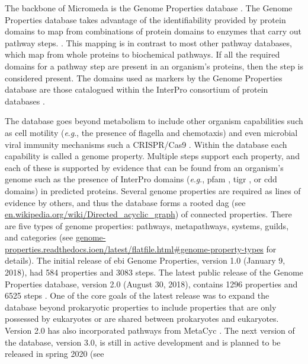 The backbone of Micromeda is the Genome Properties database \cite{Haft2013}. 
The Genome Properties database takes advantage of the identifiability provided 
by protein domains to map from combinations of protein domains to enzymes that 
carry out pathway steps. \cite{richardson2018genome}. This mapping is in 
contrast to most other pathway databases, which map from whole proteins to 
biochemical pathways. If all the required domains for a pathway step are present 
in an organism's proteins, then the step is considered present. The domains used 
as markers by the Genome Properties database are those catalogued within the 
InterPro consortium of protein databases 
\cite{apweiler2000interpro,richardson2018genome}. 

The database goes beyond metabolism to include other organism capabilities such as 
cell motility (\textit{e}.\textit{g}., the presence of flagella and chemotaxis) 
and even microbial viral immunity mechanisms such a CRISPR/Cas9 
\cite{horvath2010crispr}. Within the database each capability is called a genome 
property. Multiple steps support each property, and each of these is supported 
by evidence that can be found from an organism's genome such as the presence of 
InterPro domains (\textit{e}.\textit{g}., \gls{pfam} \cite{bateman2004pfam}, 
\gls{tigr} \cite{haft2001tigrfams}, or \gls{cdd} \cite{marchler2014cdd} domains) 
in predicted proteins. Several genome properties are required as lines of 
evidence by others, and thus the database forms a rooted \gls{dag} (see 
\href{http://en.wikipedia.org/wiki/Directed_acyclic_graph}{en.wikipedia.org/wiki/Directed\_acyclic\_graph}) 
of connected properties. There are five types of genome properties: pathways, 
metapathways, systems, guilds, and categories (see 
\href{http://genome-properties.readthedocs.io/en/latest/flatfile.html#genome-property-types}{genome-properties.readthedocs.ioen/latest/flatfile.html\#genome-property-types} 
for details). The initial release of \gls{ebi} Genome Properties, version 1.0 
(January 9, 2018), had 584 properties and 3083 steps. The latest public release 
of the Genome Properties database, version 2.0 (August 30, 2018), contains 1296 
properties and 6525 steps \cite{richardson2018genome}. One of the core goals of 
the latest release was to expand the database beyond prokaryotic properties to 
include properties that are only possessed by eukaryotes or are shared between 
prokaryotes and eukaryotes. Version 2.0 has also incorporated pathways from 
MetaCyc \cite{karp2002metacyc}. The next version of the database, version 3.0, 
is still in active development and is planned to be released in spring 2020 (see 
